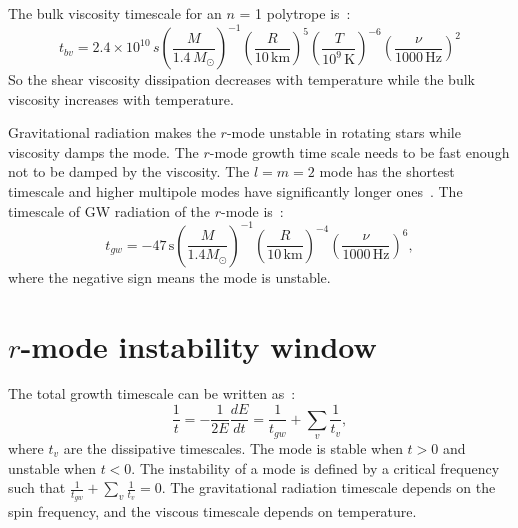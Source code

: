 \documentclass{ttuthes2007}
\begin{document}
The bulk viscosity timescale for an $n$ = 1 polytrope is~\cite{ANDERSSON_2001}:
\begin{equation}
t_{bv}=2.4 \times 10^{10}\,s
\left(\frac{M}{1.4\,M_\odot}\right)^{-1}\left(\frac{R}{10\,\mathrm{km}}\right)^5\left(\frac{T}{10^9\,\mathrm{K}}\right)^{-6}\left(\frac{\nu}{1000\,\mathrm{Hz}}\right)^2
\end{equation}
So the shear viscosity dissipation decreases
with temperature while the bulk viscosity increases with temperature.

Gravitational radiation makes the $r$-mode unstable in rotating stars while
viscosity damps the mode. The $r$-mode growth time scale needs to be fast enough not to be damped by the
viscosity. The $l=m=2$ mode has the shortest timescale and higher multipole
modes have
significantly longer ones~\cite{ANDERSSON_2001}. The timescale of
\ac{GW} radiation of the $r$-mode is~\cite{ANDERSSON_2001}:
\begin{equation}
t_{gw}=-47\,\mathrm{s}                                                       
\left(\frac{M}{1.4M_\odot}\right)^{-1}\left(\frac{R}{10\,\mathrm{km}}\right)^{-4}
\left(\frac{\nu}{1000\,\mathrm{Hz}}\right)^6,
\end{equation}
where the negative sign means the mode is unstable.

\section{$r$-mode instability window}
The total growth timescale can be written as~\cite{Owen_2000}:
\begin{equation}
\frac{1}{t}=-\frac{1}{2E}\frac{dE}{dt}=\frac{1}{t_{gw}}+\sum_v \frac{1}{t_v},
\end{equation}
where $t_v$ are the dissipative timescales.
The mode is stable when $t>0$ and unstable when $t<0$. 
The instability of a mode is defined by a critical frequency such that
$\frac{1}{t_{gw}}+\sum_v \frac{1}{t_v}= 0$.
The gravitational radiation timescale depends on the spin frequency, and the viscous
timescale depends on temperature. 
\end{document}
